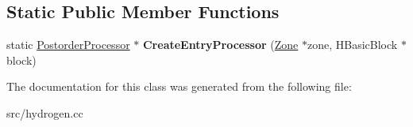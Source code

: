\subsection*{Static Public Member Functions}
\begin{DoxyCompactItemize}
\item 
\hypertarget{classv8_1_1internal_1_1_postorder_processor_a93f8f020ad8ab4f2810d0c14c72380c9}{}static \hyperlink{classv8_1_1internal_1_1_postorder_processor}{Postorder\+Processor} $\ast$ {\bfseries Create\+Entry\+Processor} (\hyperlink{classv8_1_1internal_1_1_zone}{Zone} $\ast$zone, H\+Basic\+Block $\ast$block)\label{classv8_1_1internal_1_1_postorder_processor_a93f8f020ad8ab4f2810d0c14c72380c9}

\end{DoxyCompactItemize}


The documentation for this class was generated from the following file\+:\begin{DoxyCompactItemize}
\item 
src/hydrogen.\+cc\end{DoxyCompactItemize}
